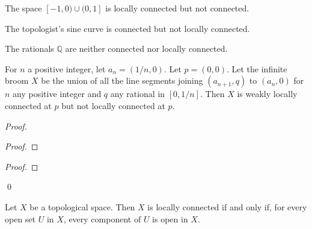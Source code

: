 \begin{ex}
The space $[-1,0) \cup (0,1]$ is locally connected but not connected.
\end{ex}

\begin{ex}
The topologist's sine curve is connected but not locally connected.
\end{ex}

\begin{ex}
The rationals $\mathbb{Q}$ are neither connected nor locally connected.
\end{ex}

\begin{ex}
For $n$ a positive integer, let $a_n = (1/n,0)$. Let $p = (0,0)$. Let the infinite broom $X$ be the union of all the line segments joining $(a_{n+1},q)$ to $(a_n,0)$ for $n$ any positive integer and $q$ any rational in $[0,1/n]$. Then $X$ is weakly locally connected at $p$ but not locally connected at $p$.
\end{ex}

\begin{proof}
\pf
{}
\begin{proof}
\end{proof}
\begin{proof}
\end{proof}
\qed
\end{proof}

\begin{thm}
\label{thm:locally_connected}
Let $X$ be a topological space. Then $X$ is locally connected if and only if, for every open set $U$ in $X$, every component of $U$ is open in $X$.
\end{thm}

